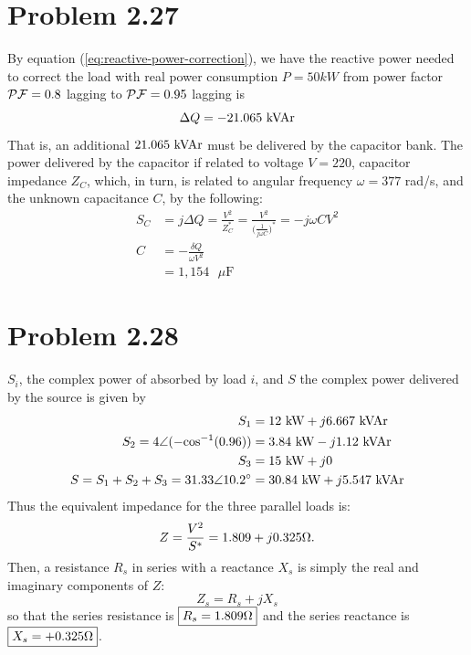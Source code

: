 \documentclass{homework}
\begin{document}
\section{Problem 2.27}
By equation (\ref{eq:reactive-power-correction}),
we have the reactive power needed to correct the load with
real power consumption $P = 50 kW$ from power factor
$\mathcal{PF} = 0.8$ lagging to $\mathcal{PF} = 0.95$ lagging is
\begin{equation}
    \Delta Q = -21.065 \text{ kVAr}
\end{equation}
That is, an additional $21.065 \text{ kVAr}$ must be delivered by
the capacitor bank. The power delivered by the capacitor
if related to voltage $V = 220$, capacitor impedance $Z_C$,
which, in turn, is related to angular frequency $\omega = 377$ rad/s,
and the unknown capacitance $C$, by the following:
\begin{align*}
    S_C &= j \Delta Q = \frac{V^2}{Z_C^*}
        = \frac{V^2}{\biggl(\frac{1}{j\omega C}\biggr)^*}
        = -j\omega C V^2 \\
    C &= - \frac{\delta Q}{\omega V^2} \\
        &= \boxed{1,154 \text{ }\mu \text{F}}
\end{align*}

\section{Problem 2.28}
$S_i$, the complex power of absorbed by load $i$, and $S$ the
complex power delivered by the source is given by
\begin{align*}
    S_1 &= 12 \text{ kW} + j6.667 \text{ kVAr} \\
    S_2 = 4 \angle (-\text{cos}^{-1}(0.96)) &= 3.84 \text{ kW} - j1.12 \text{ kVAr} \\
    S_3 &= 15 \text{ kW} + j0 \\
    S = S_1 + S_2 + S_3 = 31.33 \angle 10.2 \degree
        &= 30.84 \text{ kW} + j5.547 \text{ kVAr}
\end{align*}
Thus the equivalent impedance for the three parallel loads
is: 
\begin{equation*}
    Z = \frac{V^2}{S^*} = 1.809 + j 0.325 \ohm.
\end{equation*}
Then, a resistance $R_s$ in series with a reactance
$X_s$ is simply the real and imaginary components of $Z$:
\begin{equation*}
    Z_s = R_s + j X_s
\end{equation*}
so that the series resistance is $\boxed{R_s = 1.809 \ohm}$ and the series
reactance is $\boxed{X_s = +0.325 \ohm}$.
\end{document}
